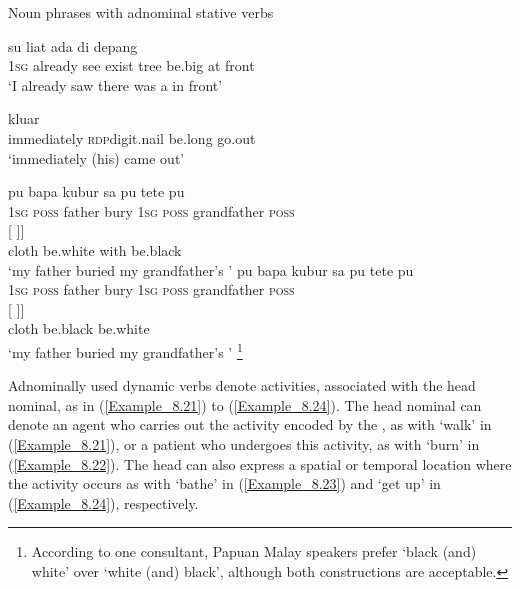 \begin{styleExampleTitle}
Noun phrases with adnominal stative verbs
\end{styleExampleTitle}
\ea
\label{Example_8.17}
 {su} {liat} {ada} {} {} {di} {depang}\\ %
 \textsc{1sg}  already  see  exist  tree  be.big  at  front\\
\glt 
‘I already saw there was a  in front’ \textstyleExampleSource{[081025-008-Cv.0019]}
\z

\ea
\label{Example_8.18}
 {} {} {kluar}\\ %
 immediately  \textsc{rdp}{\Tilde}digit.nail  be.long  go.out\\
\glt 
‘immediately (his)  came out’ \textstyleExampleSource{[081115-001a-Cv.0077]}
\z

\ea
\label{Example_8.19}
 {{pu}} {{bapa}} {kubur} {{sa}} {pu} {tete} {pu}\\ %
 \textsc{1sg}  {\textsc{poss}}  {father}  bury  {\textsc{1sg}}  \textsc{poss}  grandfather  \textsc{poss}\\
 \gll {[[\bluebold{kaing}]}  {[}  {}  {]]}\\
 {cloth}  {be.white}  {with}  {be.black}\\
\glt 
‘my father buried my grandfather’s ’ \textstyleExampleSource{[081014-014-NP.0047]}
\z
\ea
\label{Example_8.20}
 {{pu}} {{bapa}} {kubur} {sa} {pu} {tete} {pu}\\ %
 \textsc{1sg}  {\textsc{poss}}  {father}  bury  \textsc{1sg}  \textsc{poss}  grandfather  \textsc{poss}\\
 \gll {[[\bluebold{kaing}]}  {[}  {]]}\\
 {cloth}  {be.black}  {be.white}\\
\glt 
‘my father buried my grandfather’s ’ \textstyleExampleSource{[Elicited BR130221.036]}\footnote{According to one consultant, Papuan Malay speakers prefer  ‘black (and) white’ over  ‘white (and) black’, although both constructions are acceptable.}
\z



Adnominally used dynamic verbs denote activities, associated with the head nominal, as in (\ref{Example_8.21}) to (\ref{Example_8.24}). The head nominal can denote an agent who carries out the activity encoded by the , as with   ‘walk’ in (\ref{Example_8.21}), or a patient who undergoes this activity, as with   ‘burn’ in (\ref{Example_8.22}). The head can also express a spatial or temporal location where the activity occurs as with   ‘bathe’ in (\ref{Example_8.23}) and  ‘get up’ in (\ref{Example_8.24}), respectively.



